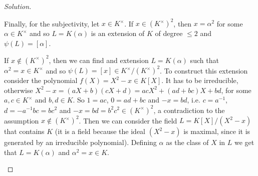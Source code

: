\documentclass[a4paper,10pt,reqno]{amsart}
\newenvironment{sol}
  {\renewcommand\qedsymbol{$\blacksquare$}\begin{proof}[Solution]}
  {\end{proof}}
\begin{document}
\begin{sol}
\begin{enumerate}[label=(\roman*)]
        Finally, for the subjectivity, let $x\in K^\times$.
        If $x\in (K^\times)^2$, then $x=\alpha^2$ for some $\alpha\in K^\times$
        and so $L=K(\alpha)$ is an extension of $K$ of degree $\leq 2$ 
        and $\psi(L)=[\alpha]$.

        If $x\not\in (K^\times)^2$, then we can find and extension $L=K(\alpha)$ such that
        $\alpha^2=x\in K^\times$ and so $\psi(L)=[x]\in K^\times/(K^\times)^2$.
        To construct this extension consider the polynomial $f(X)=X^2-x\in K[X]$.
        It has to be irreducible, otherwise $X^2-x=(aX+b)(cX+d)=acX^2+(ad+bc)X+bd$, for some
        $a,c\in K^\times$ and $b,d\in K$.
        So $1=ac$, $0=ad+bc$ and $-x=bd$, i.e. $c=a^{-1}$, $d=-a^{-1}bc=bc^2$ and $-x=bd=b^2c^2\in (K^\times)^2$, a contradiction to the assumption $x\not\in (K^\times)^2$.
        Then we can consider the field $L=K[X]/(X^2-x)$ that contains $K$
        (it is a field because the ideal $(X^2-x)$ is maximal,
        since it is generated by an irreducible polynomial).
        Defining $\alpha$ as the class of $X$ in $L$ 
        we get that $L=K(\alpha)$ and $\alpha^2=x\in K$.\qedhere
    \end{enumerate}    
\end{sol}
\end{document}

